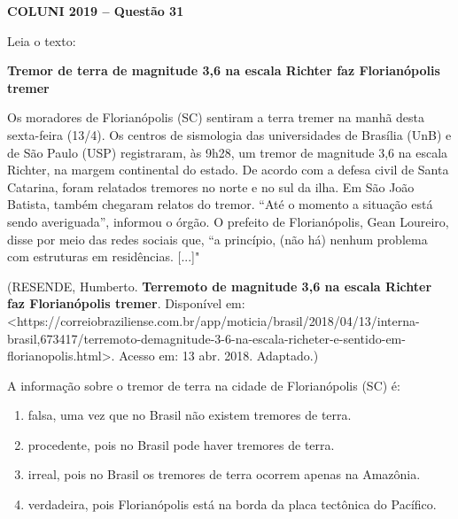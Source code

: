 \textbf{COLUNI 2019 -- Questão 31}\par\medskip Leia o texto:

\par

\textbf{Tremor de terra de magnitude 3,6 na escala Richter faz Florianópolis tremer}

\par

Os moradores de Florianópolis (SC) sentiram a terra tremer na manhã desta sexta-feira (13/4). Os centros de sismologia das universidades de Brasília (UnB) e de São Paulo (USP) registraram, às 9h28, um tremor de magnitude 3,6 na escala Richter, na margem continental do estado. De acordo com a defesa civil de Santa Catarina, foram relatados tremores no norte e no sul da ilha. Em São João Batista, também chegaram relatos do tremor. “Até o momento a situação está sendo averiguada”, informou o órgão. O prefeito de Florianópolis, Gean Loureiro, disse por meio das redes sociais que, “a princípio, (não há) nenhum problema com estruturas em residências. [...]"

\par

(RESENDE, Humberto. \textbf{Terremoto de magnitude 3,6 na escala Richter faz Florianópolis tremer}. Disponível em: <https://correiobraziliense.com.br/app/moticia/brasil/2018/04/13/interna-brasil,673417/terremoto-demagnitude-3-6-na-escala-richeter-e-sentido-em-florianopolis.html>. Acesso em: 13 abr. 2018. Adaptado.)

\par

A informação sobre o tremor de terra na cidade de Florianópolis (SC) é:\begin{enumerate}
\item falsa, uma vez que no Brasil não existem tremores de terra.
\item procedente, pois no Brasil pode haver tremores de terra.
\item irreal, pois no Brasil os tremores de terra ocorrem apenas na Amazônia.
\item verdadeira, pois Florianópolis está na borda da placa tectônica do Pacífico.\end{enumerate}
